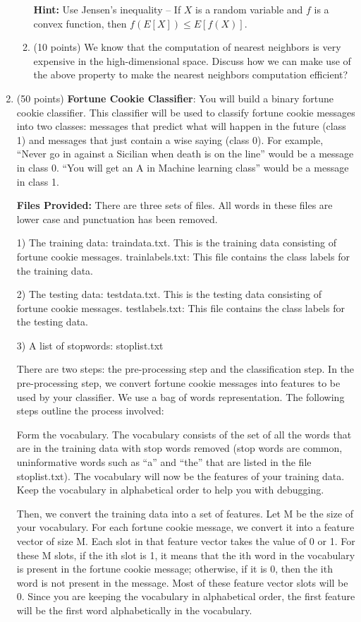 \documentclass[11pt]{article}
\begin{document}
\begin{enumerate}
\begin{enumerate}
    \textbf{Hint: } Use Jensen’s inequality – If $X$ is a random
    variable and $f$ is a convex function, then $f(E[X]) \le
    E[f(X)]$.

    
    \item (10 points) We know that the computation of nearest
    neighbors is very expensive in the high-dimensional space.
    Discuss how we can make use of the above property to make the
    nearest neighbors computation efficient?


\end{enumerate}

\item (50 points) \textbf{Fortune Cookie Classifier}: You will
build a binary fortune cookie classifier. This classifier will be
used to classify fortune cookie messages into two classes:
messages that predict what will happen in the future (class 1)
and messages that just contain a wise saying (class 0). For
example, ``Never go in against a Sicilian when death is on the
line'' would be a message in class 0. ``You will get an A in
Machine learning class'' would be a message in class 1.

\textbf{Files Provided:} There are three sets of files. All words
in these files are lower case and punctuation has been removed.

1) The training data: traindata.txt. This is the training data
consisting of fortune cookie messages. trainlabels.txt: This file
contains the class labels for the training data. 

2) The testing data: testdata.txt. This is the testing data
consisting of fortune cookie messages. testlabels.txt: This file
contains the class labels for the testing data. 

3) A list of stopwords: stoplist.txt 

There are two steps: the pre-processing step and the
classification step. In the pre-processing step, we convert
fortune cookie messages into features to be used by your
classifier. We use a bag of words representation. The following
steps outline the process involved: 

Form the vocabulary. The vocabulary consists of the set of all
the words that are in the training data with stop words removed
(stop words are common, uninformative words such as ``a'' and
``the'' that are listed in the file stoplist.txt). The vocabulary
will now be the features of your training data. Keep the
vocabulary in alphabetical order to help you with debugging. 

Then, we convert the training data into a set of features. Let M
be the size of your vocabulary. For each fortune cookie message,
we convert it into a feature vector of size M. Each slot in
that feature vector takes the value of 0 or 1. For these M slots,
if the ith slot is 1, it means that the ith word in the
vocabulary is present in the fortune cookie message; otherwise,
if it is 0, then the ith word is not present in the message. Most
of these feature vector slots will be 0. Since you are keeping
the vocabulary in alphabetical order, the first feature will be
the first word alphabetically in the vocabulary.


\end{enumerate}
\end{document}

